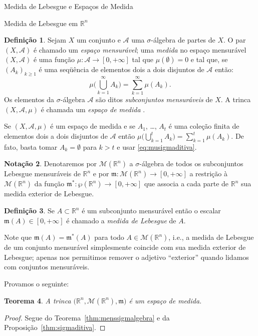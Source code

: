 \documentclass[oneside,final,11pt]{amsbook}
\newcommand{\R}{\mathds R}
\newcommand{\leb}{\mathfrak m}
\newcommand{\Lebmens}{\mathcal M}
\theoremstyle{remark}\newtheorem{exercise}{Exercício}[chapter]
\theoremstyle{remark}\newtheorem{*exercise}[exercise]{\hbox to 0pt{\hskip 0pt minus 1fil*}Exercício}
\theoremstyle{definition}\newtheorem{exdefin}{Definição}[chapter]
\theoremstyle{plain}\newtheorem{teo}{Teorema}[section]
\theoremstyle{plain}\newtheorem{lem}[teo]{Lema}
\theoremstyle{plain}\newtheorem{prop}[teo]{Proposição}
\theoremstyle{plain}\newtheorem{cor}[teo]{Corolário}
\theoremstyle{definition}\newtheorem{defin}[teo]{Definição}
\theoremstyle{remark}\newtheorem{rem}[teo]{Observação}
\theoremstyle{definition}\newtheorem{notation}[teo]{Notação}
\theoremstyle{definition}\newtheorem{convention}[teo]{Convenção}
\theoremstyle{definition}\newtheorem{example}[teo]{Exemplo}
\numberwithin{section}{chapter}
\numberwithin{equation}{section}
\begin{document}
\begin{chapter}{Medida de Lebesgue e Espaços de Medida}
\begin{section}[Medida de Lebesgue em $\R^n$]{Medida de Lebesgue em ${\R^n}$}
\begin{defin}\label{thm:defespacomedida}
Sejam $X$ um conjunto e $\mathcal A$ uma $\sigma$-álgebra de partes de $X$.
O par $(X,\mathcal A)$ é chamado um {\em espaço mensurável};
 uma {\em medida\/} no espaço mensurável
$(X,\mathcal A)$ é uma função $\mu:\mathcal A\to[0,+\infty]$ tal que $\mu(\emptyset)=0$ e tal que, se $(A_k)_{k\ge1}$ é
uma seqüência de elementos dois a dois disjuntos de $\mathcal A$ então:
\begin{equation}\label{eq:musigmaditiva}
\mu\Big(\bigcup_{k=1}^\infty A_k\Big)=\sum_{k=1}^\infty\mu(A_k).
\end{equation}
Os elementos da $\sigma$-álgebra $\mathcal A$ são ditos {\em subconjuntos mensuráveis\/}
de $X$.
A trinca $(X,\mathcal A,\mu)$ é chamada um {\em espaço de medida}
.
\end{defin}
Se $(X,\mathcal A,\mu)$ é um espaço de medida e se $A_1$, \dots, $A_t$ é uma
coleção finita de elementos dois a dois disjuntos de $\mathcal A$ então
$\mu\big(\bigcup_{k=1}^tA_k\big)=\sum_{k=1}^t\mu(A_k)$. De fato, basta tomar
$A_k=\emptyset$ para $k>t$ e usar \eqref{eq:musigmaditiva}.

\begin{notation}
Denotaremos por $\Lebmens(\R^n)$\index[simbolos]{$\Lebmens(\R^n)$} a $\sigma$-álgebra de
todos os subconjuntos Lebesgue mensuráveis de $\R^n$ e por $\leb:\Lebmens(\R^n)
\to[0,+\infty]$\index[simbolos]{$\leb(A)$} a restrição à $\Lebmens(\R^n)$ da função
$\leb^*:\wp(\R^n)\to[0,+\infty]$ que associa a cada parte de $\R^n$ sua medida
exterior de Lebesgue.
\end{notation}

\begin{defin}
Se $A\subset\R^n$ é um subconjunto mensurável então o escalar
$\leb(A)\in[0,+\infty]$ é chamado a {\em medida de Lebesgue\/}
de $A$.
\end{defin}
Note que $\leb(A)=\leb^*(A)$ para todo $A\in\Lebmens(\R^n)$, i.e.,
a medida de Lebesgue de um conjunto mensurável simplesmente coincide com sua
medida exterior de Lebesgue; apenas nos permitimos remover o adjetivo
``exterior'' quando lidamos com conjuntos mensuráveis.

Provamos o seguinte:
\begin{teo}\label{thm:Lebesguemedida}
A trinca $\big(\R^n,\Lebmens(\R^n),\leb\big)$ é um espaço de medida.
\end{teo}
\begin{proof}
Segue do Teorema~\ref{thm:menssigmalgebra} e da Proposição~\ref{thm:sigmaditiva}.
\end{proof}


\end{section}
\end{chapter}
\end{document}
